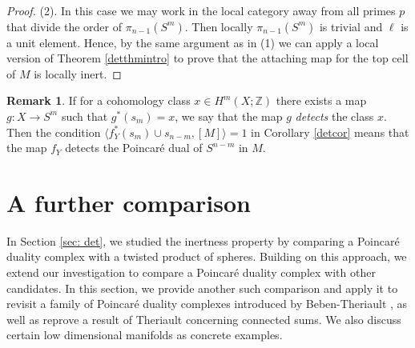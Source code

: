 \documentclass[a4]{amsart}
\theoremstyle{definition}
\newtheorem{remark}[theorem]{Remark}
\begin{document}
\begin{sloppypar}
\begin{proof}
(2). In this case we may work in the local category away from all primes $p$ that divide the order of $\pi_{n-1}(S^m)$. Then locally $\pi_{n-1}(S^m)$ is trivial and $\ell$ is a unit element. Hence, by the same argument as in (1) we can apply a local version of Theorem \ref{detthmintro} to prove that the attaching map for the top cell of $M$ is locally inert.
\end{proof}

\begin{remark}\label{det-rmk}
If for a cohomology class $x\in H^m(X;\mathbb{Z})$ there exists a map $g: X\stackrel{}{\longrightarrow} S^m$ such that $g^\ast(s_m)=x$, we say that the map $g$ {\it detects} the class $x$. Then the condition $\langle f_Y^\ast (s_m) \cup s_{n-m}, [M] \rangle=1$ in Corollary \ref{detcor} means that the map $f_Y$ detects the Poincar\'{e} dual of $S^{n-m}$ in $M$. 
\end{remark}

\newpage
\section{A further comparison}
\label{sec: ex1}
In Section \ref{sec: det}, we studied the inertness property by comparing a Poincar\'{e} duality complex with a twisted product of spheres. Building on this approach, we extend our investigation to compare a Poincar\'{e} duality complex with other candidates. In this section, we provide another such comparison and apply it to revisit a family of Poincar\'{e} duality complexes introduced by Beben-Theriault \cite{BT14}, as well as reprove a result of Theriault \cite{The24a} concerning connected sums. We also discuss certain low dimensional manifolds as concrete examples. 


\end{sloppypar}
\end{document}
